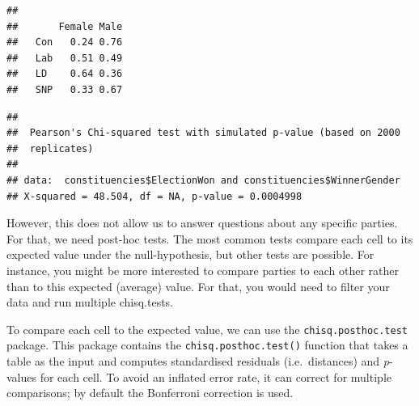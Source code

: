 \documentclass[
]{book}
\newenvironment{Shaded}{\begin{snugshade}}{\end{snugshade}}
\newcommand{\CommentTok}[1]{\textcolor[rgb]{0.56,0.35,0.01}{\textit{#1}}}
\newcommand{\DataTypeTok}[1]{\textcolor[rgb]{0.13,0.29,0.53}{#1}}
\newcommand{\DecValTok}[1]{\textcolor[rgb]{0.00,0.00,0.81}{#1}}
\newcommand{\KeywordTok}[1]{\textcolor[rgb]{0.13,0.29,0.53}{\textbf{#1}}}
\newcommand{\NormalTok}[1]{#1}
\newcommand{\OperatorTok}[1]{\textcolor[rgb]{0.81,0.36,0.00}{\textbf{#1}}}
\newcommand{\OtherTok}[1]{\textcolor[rgb]{0.56,0.35,0.01}{#1}}
\newcommand{\StringTok}[1]{\textcolor[rgb]{0.31,0.60,0.02}{#1}}
\begin{document}
\begin{Shaded}
\end{Shaded}

\begin{verbatim}
##      
##       Female Male
##   Con   0.24 0.76
##   Lab   0.51 0.49
##   LD    0.64 0.36
##   SNP   0.33 0.67
\end{verbatim}

\begin{Shaded}
\end{Shaded}

\begin{verbatim}
## 
## 	Pearson's Chi-squared test with simulated p-value (based on 2000
## 	replicates)
## 
## data:  constituencies$ElectionWon and constituencies$WinnerGender
## X-squared = 48.504, df = NA, p-value = 0.0004998
\end{verbatim}

However, this does not allow us to answer questions about any specific parties. For that, we need post-hoc tests. The most common tests compare each cell to its expected value under the null-hypothesis, but other tests are possible. For instance, you might be more interested to compare parties to each other rather than to this expected (average) value. For that, you would need to filter your data and run multiple chisq.tests.

To compare each cell to the expected value, we can use the \texttt{chisq.posthoc.test} package. This package contains the \texttt{chisq.posthoc.test()} function that takes a table as the input and computes standardised residuals (i.e.~distances) and \emph{p}-values for each cell. To avoid an inflated error rate, it can correct for multiple comparisons; by default the Bonferroni correction is used.

\begin{Shaded}
\end{Shaded}
\end{document}
